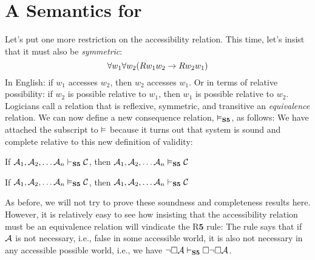 \section{A Semantics for \mlSfive}
\label{SemanticsS5}

Let's put one more restriction on the accessibility relation. This time, let's insist that it must also be \emph{symmetric}:
\[\forall w_1\forall w_2(Rw_1w_2 \rightarrow Rw_2w_1)\]
In English: if $w_1$ accesses $w_2$, then $w_2$ accesses $w_1$. Or in terms of relative possibility: if $w_2$ is possible relative to $w_1$, then $w_1$ is possible relative to $w_2$. Logicians call a relation that is reflexive, symmetric, and transitive an \emph{equivalence} relation. We can now define a new consequence relation, $\vDash_{\mathbf{S5}} $, as follows:
We have attached the \mlSfive{} subscript to $\vDash$ because it turns out that system \mlSfive{} is sound and complete relative to this new definition of validity:
\begin{compactlist}
	\item If $\mathcal{A}_1,\mathcal{A}_2, \dots \mathcal{A}_n\vdash_{\mathbf{S5}} \mathcal{C}$, then $\mathcal{A}_1,\mathcal{A}_2, \dots \mathcal{A}_n\vDash_{\mathbf{S5}} \mathcal{C}$
	\item If $\mathcal{A}_1,\mathcal{A}_2, \dots \mathcal{A}_n\vDash_{\mathbf{S5}} \mathcal{C}$, then $\mathcal{A}_1,\mathcal{A}_2, \dots \mathcal{A}_n\vdash_{\mathbf{S5}} \mathcal{C}$
\end{compactlist}
As before, we will not try to prove these soundness and completeness results here. However, it is relatively easy to see how insisting that the accessibility relation must be an equivalence relation will vindicate the R$\mathbf{5}$ rule:
The rule says that if $\mathcal{A}$ is not necessary, i.e., false in some accessible world, it is also not necessary in any accessible possible world, i.e., we have $\neg\Box \mathcal{A} \vdash_{\mathbf{S5}}  \Box\neg\Box \mathcal{A}$.

